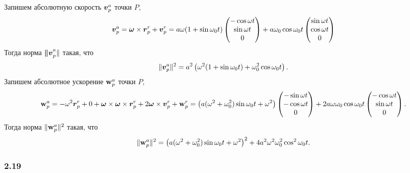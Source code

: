 Запишем абсолютную скорость $\mbox{\boldmath $v$}_p^a$ точки $P$,
$$
    \mbox{\boldmath $v$}_p^a = \mbox{\boldmath $\omega$} \times \mbox{\boldmath $r$}_p^r + \mbox{\boldmath $v$}_p^r =
    a \omega (1 + \sin \omega_0 t) \begin{pmatrix}
        -\cos \omega t \\
        \sin \omega t \\
        0 
    \end{pmatrix}
    + a \omega_0 \cos \omega_0 t \begin{pmatrix}
        \sin \omega t \\
        \cos \omega t \\
        0
    \end{pmatrix}
$$
Тогда норма $\mbox{\boldmath $\|v$}_p^a\|$ такая, что
$$
    \|\mbox{\boldmath $v$}_p^a\|^2 = a^2 \left(
        \omega^2 (1+\sin \omega_0 t) +
        \omega_0^2 \cos \omega_0 t
    \right).
$$
Запишем абсолютное ускорение $\mbox{\boldmath $\mathrm{w}$}_p^a$ точки $P$,
$$
    \mbox{\boldmath $\mathrm{w}$}_p^a = - \omega^2 \mbox{\boldmath $r$}_p^r + 0 + \mbox{\boldmath $\omega$} \times  \mbox{\boldmath $\omega$} \times \mbox{\boldmath $r$}_p^r + 2 \mbox{\boldmath $\omega$} \times \mbox{\boldmath $v$}_p^r + \mbox{\boldmath $\mathrm{w}$}_p^r
    =
    \left(a (\omega^2 + \omega_0^2) \sin \omega_0 t + \omega^2\right) \begin{pmatrix}
        - \sin \omega t \\
        - \cos \omega t \\
        0
    \end{pmatrix}
    +
    2 a \omega \omega_0 \cos \omega_0 t
    \begin{pmatrix}
        - \cos \omega t \\
        \sin \omega t \\
        0
    \end{pmatrix}.
$$
Тогда норма $ \|\mbox{\boldmath $\mathrm{w}$}_p^a\|^2 $ такая, что
$$
    \|\mbox{\boldmath $\mathrm{w}$}_p^a\|^2 = \left(
        a (\omega^2 + \omega_0^2) \sin \omega_0 t + \omega^2
    \right)^2 +
    4 a^2 \omega^2 \omega_0^2 \cos^2 \omega_0 t.
$$


\subsubsection*{2.19}

